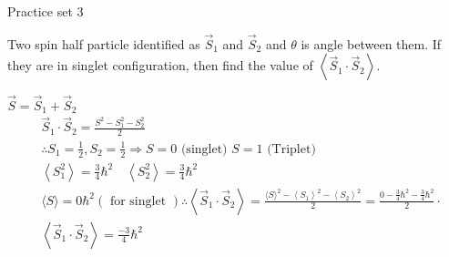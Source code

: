 \newpage
\begin{abox}
	Practice set 3
	\end{abox}
\begin{enumerate}
	\begin{minipage}{\textwidth}
	\item Two spin half particle identified as $\vec{S}_{1}$ and $\vec{S}_{2}$ and $\theta$ is angle between them. If they are in singlet configuration, then find the value of $\left\langle\vec{S}_{1} \cdot \vec{S}_{2}\right\rangle$.
\end{minipage}
\begin{answer}
	$\vec{S}=\vec{S}_{1}+\vec{S}_{2}$\\
	\begin{align*}
		&\vec{S}_{1} \cdot \vec{S}_{2}=\frac{S^{2}-S_{1}^{2}-S_{2}^{2}}{2} \\
		&\therefore S_{1}=\frac{1}{2}, S_{2}=\frac{1}{2} \Rightarrow S=0 \text { (singlet) } S=1 \text { (Triplet) } \\
		&\left\langle S_{1}^{2}\right\rangle=\frac{3}{4} \hbar^{2} \quad\left\langle S_{2}^{2}\right\rangle=\frac{3}{4} \hbar^{2} \\
		&\langle S\rangle=0 \hbar^{2}(\text { for singlet }) \therefore\left\langle\vec{S}_{1} \cdot \vec{S}_{2}\right\rangle=\frac{\langle S\rangle^{2}-\left\langle S_{1}\right\rangle^{2}-\left\langle S_{2}\right\rangle^{2}}{2}=\frac{0-\frac{3}{4} \hbar^{2}-\frac{3}{4} \hbar^{2}}{2} \cdot\\
		&\left\langle\vec{S}_{1} \cdot \vec{S}_{2}\right\rangle=\frac{-3}{4} \hbar^{2}
	\end{align*}
\end{answer}



\end{enumerate}
